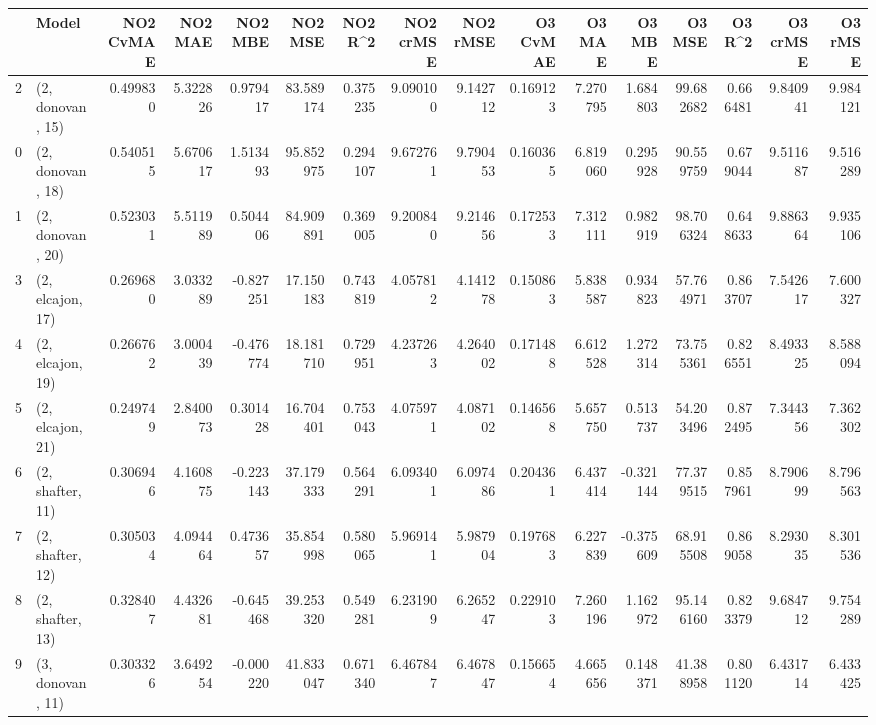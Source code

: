 \begin{tabular}{llrrrrrrrrrrrrrr}
\toprule
{} &             Model &  NO2 CvMAE &   NO2 MAE &   NO2 MBE &    NO2 MSE &   NO2 R\textasciicircum2 &  NO2 crMSE &  NO2 rMSE &  O3 CvMAE &    O3 MAE &    O3 MBE &      O3 MSE &    O3 R\textasciicircum2 &   O3 crMSE &    O3 rMSE \\
\midrule
2  &  (2, donovan, 15) &   0.499830 &  5.322826 &  0.979417 &  83.589174 &  0.375235 &   9.090100 &  9.142712 &  0.169123 &  7.270795 &  1.684803 &   99.682682 &  0.666481 &   9.840941 &   9.984121 \\
0  &  (2, donovan, 18) &   0.540515 &  5.670617 &  1.513493 &  95.852975 &  0.294107 &   9.672761 &  9.790453 &  0.160365 &  6.819060 &  0.295928 &   90.559759 &  0.679044 &   9.511687 &   9.516289 \\
1  &  (2, donovan, 20) &   0.523031 &  5.511989 &  0.504406 &  84.909891 &  0.369005 &   9.200840 &  9.214656 &  0.172533 &  7.312111 &  0.982919 &   98.706324 &  0.648633 &   9.886364 &   9.935106 \\
3  &  (2, elcajon, 17) &   0.269680 &  3.033289 & -0.827251 &  17.150183 &  0.743819 &   4.057812 &  4.141278 &  0.150863 &  5.838587 &  0.934823 &   57.764971 &  0.863707 &   7.542617 &   7.600327 \\
4  &  (2, elcajon, 19) &   0.266762 &  3.000439 & -0.476774 &  18.181710 &  0.729951 &   4.237263 &  4.264002 &  0.171488 &  6.612528 &  1.272314 &   73.755361 &  0.826551 &   8.493325 &   8.588094 \\
5  &  (2, elcajon, 21) &   0.249749 &  2.840073 &  0.301428 &  16.704401 &  0.753043 &   4.075971 &  4.087102 &  0.146568 &  5.657750 &  0.513737 &   54.203496 &  0.872495 &   7.344356 &   7.362302 \\
6  &  (2, shafter, 11) &   0.306946 &  4.160875 & -0.223143 &  37.179333 &  0.564291 &   6.093401 &  6.097486 &  0.204361 &  6.437414 & -0.321144 &   77.379515 &  0.857961 &   8.790699 &   8.796563 \\
7  &  (2, shafter, 12) &   0.305034 &  4.094464 &  0.473657 &  35.854998 &  0.580065 &   5.969141 &  5.987904 &  0.197683 &  6.227839 & -0.375609 &   68.915508 &  0.869058 &   8.293035 &   8.301536 \\
8  &  (2, shafter, 13) &   0.328407 &  4.432681 & -0.645468 &  39.253320 &  0.549281 &   6.231909 &  6.265247 &  0.229103 &  7.260196 &  1.162972 &   95.146160 &  0.823379 &   9.684712 &   9.754289 \\
9  &  (3, donovan, 11) &   0.303326 &  3.649254 & -0.000220 &  41.833047 &  0.671340 &   6.467847 &  6.467847 &  0.156654 &  4.665656 &  0.148371 &   41.388958 &  0.801120 &   6.431714 &   6.433425 \\

\end{tabular}
